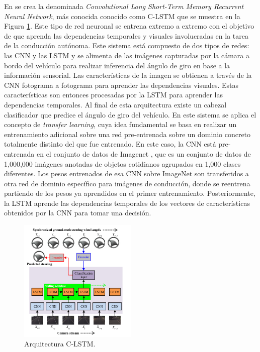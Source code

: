En \cite{temporal-dependencies} se crea la denominada \textit{Convolutional Long Short-Term Memory Recurrent Neural Network}, más conocida conocido como C-LSTM que se muestra en la Figura \ref{fig.clstm}. Este tipo de red neuronal se entrena extremo a extremo con el objetivo de que aprenda las dependencias temporales y visuales involucradas en la tarea de la conducción autónoma. Este sistema está compuesto de dos tipos de redes: las CNN y las LSTM y se alimenta de las imágenes capturadas por la cámara a bordo del vehículo para realizar inferencia del ángulo de giro en base a la información sensorial. Las características de la imagen se obtienen a través de la CNN fotograma a fotograma para aprender las dependencias visuales. Estas características son entonces procesadas por la LSTM para aprender las dependencias temporales. Al final de esta arquitectura existe un cabezal clasificador que predice el ángulo de giro del vehículo. En este sistema se aplica el concepto de \textit{transfer learning}, cuya idea fundamental se basa en realizar un entrenamiento adicional sobre una red pre-entrenada sobre un dominio concreto totalmente distinto del que fue entrenado. En este caso, la CNN está pre-entrenada en el conjunto de datos de Imagenet \cite{imagenet}, que es un conjunto de datos de 1,000,000 imágenes anotadas de objetos cotidianos agrupados en 1,000 clases diferentes. Los pesos entrenados de esa CNN sobre ImageNet son transferidos a otra red de dominio específico para imágenes de conducción, donde se reentrena partiendo de los pesos ya aprendidos en el primer entrenamiento. Posteriormente, la LSTM aprende las dependencias temporales de los vectores de características obtenidos por la CNN para tomar una decisión. 

\begin{figure}
\begin{center}
	\includegraphics[width=0.5\textwidth]{img/clstm.png}
   \caption{Arquitectura C-LSTM.}
	\label{fig.clstm}
\end{center}
\end{figure}

